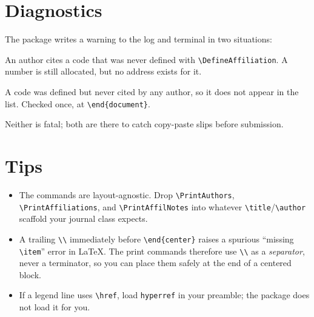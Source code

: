 \documentclass[11pt]{article}
\newcommand{\cs}[1]{\texttt{\textbackslash #1}}
\begin{document}
\section{Diagnostics}
The package writes a warning to the log and terminal in two situations:
\begin{description}[leftmargin=2.6cm,style=nextline,font=\ttfamily]
  \item[unknown-code] An author cites a code that was never defined with
    \cs{DefineAffiliation}. A number is still allocated, but no address exists
    for it.
  \item[unused-affil] A code was defined but never cited by any author, so it
    does not appear in the list. Checked once, at \cs{end\{document\}}.
\end{description}
Neither is fatal; both are there to catch copy-paste slips before submission.

\section{Tips}
\begin{itemize}[leftmargin=1.4em]
  \item The commands are layout-agnostic. Drop \cs{PrintAuthors},
    \cs{PrintAffiliations}, and \cs{PrintAffilNotes} into whatever
    \cs{title}/\cs{author} scaffold your journal class expects.
  \item A trailing \cs{\textbackslash} immediately before \cs{end\{center\}}
    raises a spurious ``missing \cs{item}'' error in \LaTeX. The print commands
    therefore use \cs{\textbackslash} as a \emph{separator}, never a terminator,
    so you can place them safely at the end of a centered block.
  \item If a legend line uses \cs{href}, load \texttt{hyperref} in your
    preamble; the package does not load it for you.
\end{itemize}
\end{document}
